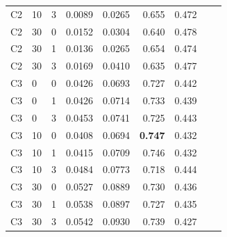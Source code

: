 \documentclass[pdflatex,sn-mathphys-num]{sn-jnl}%
\theoremstyle{thmstyleone}%
\theoremstyle{thmstyletwo}%
\theoremstyle{thmstylethree}%
\begin{document}
\begin{appendices}
\begin{table}
\begin{tabular}{llrrrrrrr}
C2 & 10 & 3 & 0.0089 & 0.0265 & 0.655 & 0.472 \\
C2 & 30 & 0 & 0.0152 & 0.0304 & 0.640 & 0.478 \\
C2 & 30 & 1 & 0.0136 & 0.0265 & 0.654 & 0.474 \\
C2 & 30 & 3 & 0.0169 & 0.0410 & 0.635 & 0.477 \\
\addlinespace[4pt]
C3 & 0 & 0 & 0.0426 & 0.0693 & 0.727 & 0.442 \\
C3 & 0 & 1 & 0.0426 & 0.0714 & 0.733 & 0.439 \\
C3 & 0 & 3 & 0.0453 & 0.0741 & 0.725 & 0.443 \\
C3 & 10 & 0 & 0.0408 & 0.0694 & \textbf{0.747} & 0.432 \\
C3 & 10 & 1 & 0.0415 & 0.0709 & 0.746 & 0.432 \\
C3 & 10 & 3 & 0.0484 & 0.0773 & 0.718 & 0.444 \\
C3 & 30 & 0 & 0.0527 & 0.0889 & 0.730 & 0.436 \\
C3 & 30 & 1 & 0.0538 & 0.0897 & 0.727 & 0.435 \\
C3 & 30 & 3 & 0.0542 & 0.0930 & 0.739 & 0.427 \\
\bottomrule
\end{tabular}
\end{table}


\end{appendices}
\end{document}

